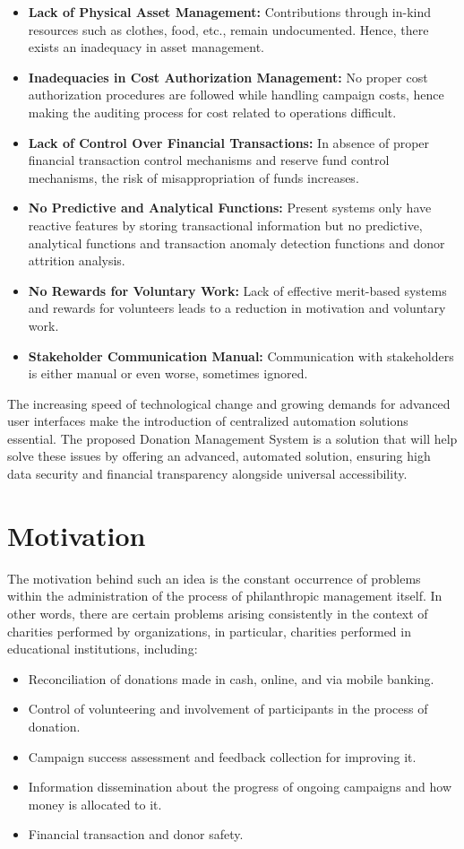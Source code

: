 \documentclass{thesis-library}
\begin{document}
\begin{itemize}
    \item \textbf{Lack of Physical Asset Management:} Contributions through in-kind resources such as clothes, food, etc., remain undocumented. Hence, there exists an inadequacy in asset management.
    \item \textbf{Inadequacies in Cost Authorization Management:} No proper cost authorization procedures are followed while handling campaign costs, hence making the auditing process for cost related to operations difficult.
    \item \textbf{Lack of Control Over Financial Transactions:} In absence of proper financial transaction control mechanisms and reserve fund control mechanisms, the risk of misappropriation of funds increases.
    \item \textbf{No Predictive and Analytical Functions:} Present systems only have reactive features by storing transactional information but no predictive, analytical functions and transaction anomaly detection functions and donor attrition analysis.
    \item \textbf{No Rewards for Voluntary Work:} Lack of effective merit-based systems and rewards for volunteers leads to a reduction in motivation and voluntary work.
    \item \textbf{Stakeholder Communication Manual:} Communication with stakeholders is either manual or even worse, sometimes ignored.
\end{itemize}

The increasing speed of technological change and growing demands for advanced user interfaces make the introduction of centralized automation solutions essential. The proposed Donation Management System is a solution that will help solve these issues by offering an advanced, automated solution, ensuring high data security and financial transparency alongside universal accessibility.

\section{Motivation}
The motivation behind such an idea is the constant occurrence of problems within the administration of the process of philanthropic management itself. In other words, there are certain problems arising consistently in the context of charities performed by organizations, in particular, charities performed in educational institutions, including:
\begin{itemize}
    \item Reconciliation of donations made in cash, online, and via mobile banking.
    \item Control of volunteering and involvement of participants in the process of donation.
    \item Campaign success assessment and feedback collection for improving it.
    \item Information dissemination about the progress of ongoing campaigns and how money is allocated to it.
    \item Financial transaction and donor safety.
\end{itemize}
\end{document}
